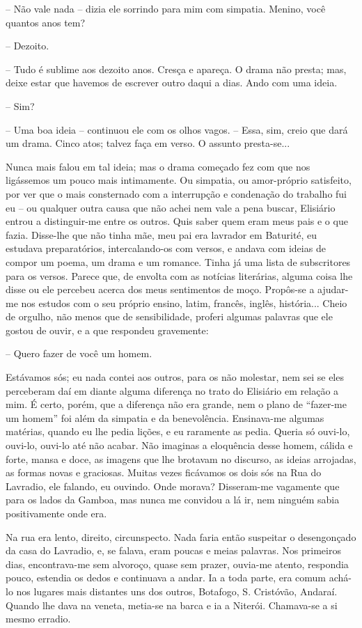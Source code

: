 -- Não vale nada -- dizia ele sorrindo para mim com simpatia. Menino,
você quantos anos tem?

-- Dezoito.

-- Tudo é sublime aos dezoito anos. Cresça e apareça. O drama não
presta; mas, deixe estar que havemos de escrever outro daqui a dias.
Ando com uma ideia.

-- Sim?

-- Uma boa ideia -- continuou ele com os olhos vagos. -- Essa, sim,
creio que dará um drama. Cinco atos; talvez faça em verso. O assunto
presta-se...

Nunca mais falou em tal ideia; mas o drama começado fez com que nos
ligássemos um pouco mais intimamente. Ou simpatia, ou amor-próprio
satisfeito, por ver que o mais consternado com a interrupção e
condenação do trabalho fui eu -- ou qualquer outra causa que não achei
nem vale a pena buscar, Elisiário entrou a distinguir-me entre os
outros. Quis saber quem eram meus pais e o que fazia. Disse-lhe que não
tinha mãe, meu pai era lavrador em Baturité, eu estudava preparatórios,
intercalando-os com versos, e andava com ideias de compor um poema, um
drama e um romance. Tinha já uma lista de subscritores para os versos.
Parece que, de envolta com as notícias literárias, alguma coisa lhe
disse ou ele percebeu acerca dos meus sentimentos de moço. Propôs-se a
ajudar-me nos estudos com o seu próprio ensino, latim, francês, inglês,
história... Cheio de orgulho, não menos que de sensibilidade, proferi
algumas palavras que ele gostou de ouvir, e a que respondeu gravemente:

-- Quero fazer de você um homem.

Estávamos sós; eu nada contei aos outros, para os não molestar, nem sei
se eles perceberam daí em diante alguma diferença no trato do Elisiário
em relação a mim. É certo, porém, que a diferença não era grande, nem o
plano de ``fazer-me um homem'' foi além da simpatia e da benevolência.
Ensinava-me algumas matérias, quando eu lhe pedia lições, e eu raramente
as pedia. Queria só ouvi-lo, ouvi-lo, ouvi-lo até não acabar. Não
imaginas a eloquência desse homem, cálida e forte, mansa e doce, as
imagens que lhe brotavam no discurso, as ideias arrojadas, as formas
novas e graciosas. Muitas vezes ficávamos os dois sós na Rua do
Lavradio, ele falando, eu ouvindo. Onde morava? Disseram-me vagamente
que para os lados da Gamboa, mas nunca me convidou a lá ir, nem ninguém
sabia positivamente onde era.

Na rua era lento, direito, circunspecto. Nada faria então suspeitar o
desengonçado da casa do Lavradio, e, se falava, eram poucas e meias
palavras. Nos primeiros dias, encontrava-me sem alvoroço, quase sem
prazer, ouvia-me atento, respondia pouco, estendia os dedos e continuava
a andar. Ia a toda parte, era comum achá-lo nos lugares mais distantes
uns dos outros, Botafogo, S. Cristóvão, Andaraí. Quando lhe dava na
veneta, metia-se na barca e ia a Niterói. Chamava-se a si mesmo erradio.

